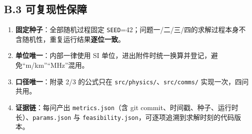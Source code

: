 \subsection*{B.3 可复现性保障}

\begin{enumerate}[label=(\arabic*),leftmargin=2em]
	\item \textbf{固定种子}：全部随机过程固定 \texttt{SEED}=42；问题一/二/三/四的求解过程本身不含随机性，重复运行结果\textbf{逐位一致}。
	\item \textbf{单位唯一}：内部一律使用 SI 单位，进出附件时统一换算并登记，避免“m/km”“MHz”混用。
	\item \textbf{口径唯一}：附录 2/3 的公式只在 \texttt{src/physics/}、\texttt{src/comms/} 实现一次，四问共用。
	\item \textbf{证据链}：每问产出 \texttt{metrics.json}（含 git commit、时间戳、种子、运行时长）、\texttt{params.json} 与 \texttt{feasibility.json}，可逐项追溯到求解时刻的代码版本。
\end{enumerate}
